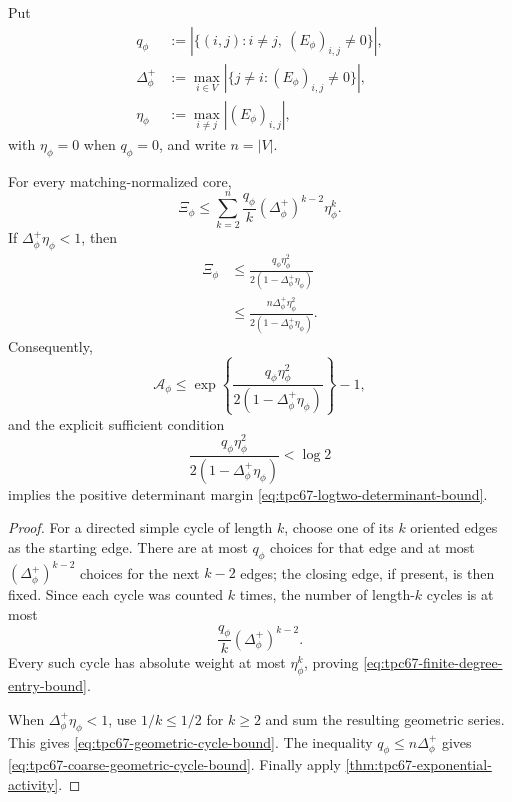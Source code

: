 Put
\begin{align}
 q_\phi
 &:=
 |\{(i,j):i\ne j,\ (E_\phi)_{i,j}\ne0\}|,
 \nonumber\\
 \Delta_\phi^+
 &:=
 \max_{i\in V}
 |\{j\ne i:(E_\phi)_{i,j}\ne0\}|,
 \nonumber\\
 \eta_\phi
 &:=
 \max_{i\ne j}|(E_\phi)_{i,j}|,
 \label{eq:tpc67-degree-entry-parameters}
\end{align}
with \(\eta_\phi=0\) when \(q_\phi=0\), and write \(n=|V|\).

\begin{proposition}
\label{prop:tpc67-degree-entry-cycle-bound}
For every matching-normalized core,
\begin{equation}
 \boxed{
 \Xi_\phi
 \le
 \sum_{k=2}^{n}
 \frac{q_\phi}{k}
 (\Delta_\phi^+)^{k-2}\eta_\phi^k.}
 \label{eq:tpc67-finite-degree-entry-bound}
\end{equation}
If \(\Delta_\phi^+\eta_\phi<1\), then
\begin{align}
 \Xi_\phi
 &\le
 \frac{q_\phi\eta_\phi^2}
      {2(1-\Delta_\phi^+\eta_\phi)}
 \label{eq:tpc67-geometric-cycle-bound}\\
 &\le
 \frac{n\Delta_\phi^+\eta_\phi^2}
      {2(1-\Delta_\phi^+\eta_\phi)}.
 \label{eq:tpc67-coarse-geometric-cycle-bound}
\end{align}
Consequently,
\begin{equation}
 \mathcal A_\phi
 \le
 \exp\left\{
 \frac{q_\phi\eta_\phi^2}
      {2(1-\Delta_\phi^+\eta_\phi)}
 \right\}-1,
 \label{eq:tpc67-degree-entry-activity-bound}
\end{equation}
and the explicit sufficient condition
\begin{equation}
 \frac{q_\phi\eta_\phi^2}
      {2(1-\Delta_\phi^+\eta_\phi)}
 <\log2
 \label{eq:tpc67-degree-entry-logtwo}
\end{equation}
implies the positive determinant margin
\eqref{eq:tpc67-logtwo-determinant-bound}.
\end{proposition}

\begin{proof}
For a directed simple cycle of length \(k\), choose one of its \(k\)
oriented edges as the starting edge.  There are at most \(q_\phi\) choices
for that edge and at most
\((\Delta_\phi^+)^{k-2}\) choices for the next \(k-2\) edges; the closing
edge, if present, is then fixed.  Since each cycle was counted \(k\) times,
the number of length-\(k\) cycles is at most
\[
 \frac{q_\phi}{k}(\Delta_\phi^+)^{k-2}.
\]
Every such cycle has absolute weight at most \(\eta_\phi^k\), proving
\eqref{eq:tpc67-finite-degree-entry-bound}.

When \(\Delta_\phi^+\eta_\phi<1\), use \(1/k\le1/2\) for \(k\ge2\) and
sum the resulting geometric series.  This gives
\eqref{eq:tpc67-geometric-cycle-bound}.  The inequality
\(q_\phi\le n\Delta_\phi^+\) gives
\eqref{eq:tpc67-coarse-geometric-cycle-bound}.  Finally apply
\cref{thm:tpc67-exponential-activity}.
\end{proof}


